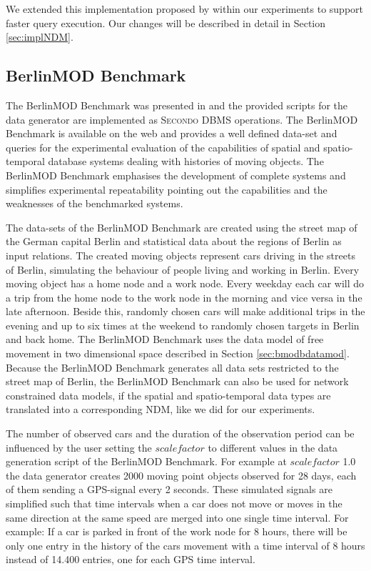 \documentclass[a4paper]{article}
\newcommand{\secondo}{\textsc{Secondo}}
\newcommand{\bmodb} {BerlinMOD Benchmark}
\begin{document}
We extended this implementation proposed by \cite{NetworkGueting} within our
experiments to support faster query execution. Our changes will be described in
detail in Section \ref{sec:implNDM}.
\subsection{BerlinMOD Benchmark}
\label{sec:bmodb}
The \bmodb{} was presented in \cite{BerlinMODVLDBDuentgen} and the
provided scripts for the data generator are implemented as \secondo{} DBMS 
operations.
The \bmodb{} is available on the web \cite{berlinmodweb} and provides a well defined
data-set and queries for the experimental evaluation of the capabilities of
spatial and spatio-temporal database systems dealing with histories of moving
objects. The \bmodb{} emphasises the development of complete systems
and simplifies experimental repeatability pointing out the capabilities and the
weaknesses of the benchmarked systems.

The data-sets of the \bmodb{} are created using the street map of the German
capital Berlin \cite{bbike} and statistical data about the regions of Berlin
\cite{bevberlin,berlinstadtatlas} as input relations.
The created moving objects represent cars driving in the streets of Berlin,
simulating the behaviour of people living and working in Berlin.
Every moving object has a home node and a work node. Every weekday each car will
do a trip from the home node to the work node in the morning and vice versa
in the late afternoon. Beside this, randomly chosen cars will make additional
trips in the evening and up to six times at the weekend to randomly chosen
targets in Berlin and back home. The \bmodb{} uses the data model of free
movement in two dimensional space described in Section \ref{sec:bmodbdatamod}.
Because the \bmodb{} generates all data sets restricted to the street map of
Berlin, the \bmodb{} can also be used for network constrained data models, if
the spatial and spatio-temporal data types are translated into a corresponding
NDM, like we did for our experiments.

The number of observed cars and the duration of the observation period can be
influenced by the user setting the $scalefactor$ to different values in the data
generation script of the \bmodb{}. For example at $scalefactor$ 1.0 the data 
generator creates 2000 moving point objects observed for 28 days, each of them
sending a GPS-signal every 2 seconds. These simulated signals are simplified
such that time intervals when a car does not move or moves in the same direction
at the same speed are merged into one single time interval. For example: If a
car is parked in front of the work node for 8 hours, there will be only one
entry in the history of the cars movement with a time interval of 8 hours
instead of 14.400 entries, one for each GPS time interval.
\end{document}
